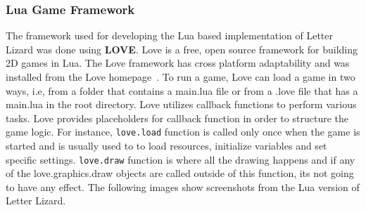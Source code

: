 \subsubsection{Lua Game Framework}
The framework used for developing the Lua based implementation of Letter Lizard was done using \textbf{LOVE}. Love is a free, open source framework for building 2D games in Lua. The Love framework has cross platform adaptability and was installed from the Love homepage~\cite{about_love}. To run a game, Love can load a game in two ways, i.e, from a folder that contains a main.lua file or from a .love file that has a main.lua in the root directory. Love utilizes callback functions to perform various tasks. Love provides placeholders for callback function in order to structure the game logic. For instance, \texttt{love.load} function is called only once when the game is started and is usually used to to load resources, initialize variables and set specific settings. \texttt{love.draw} function is where all the drawing happens and if any of the love.graphics.draw objects are called outside of this function, its not going to have any effect. The following images show screenshots from the Lua version of Letter Lizard.

